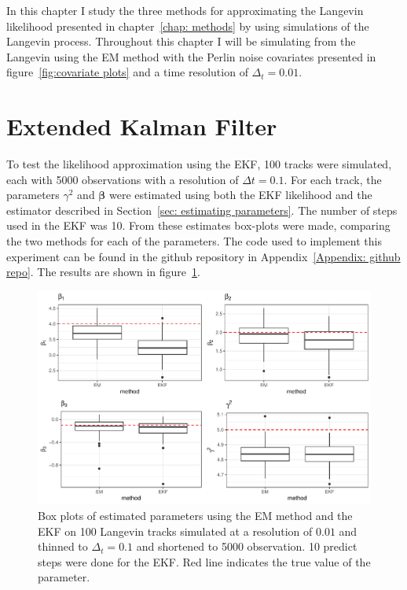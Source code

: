


In this chapter I study the three methods for approximating the Langevin likelihood presented in chapter~\ref{chap: methods} by using simulations of the Langevin process. Throughout this chapter I will be simulating from the Langevin using the EM method with the Perlin noise covariates presented in figure~\ref{fig:covariate plots} and a time resolution of $\Delta_t =0.01$.




\section{Extended Kalman Filter}
\label{sec: EKF test}
To test the likelihood approximation using the EKF, 100 tracks were simulated, each with 5000 observations with a resolution of $\Delta t = 0.1$. For each track, the parameters $\gamma^2$ and $\bm \beta$ were estimated using both the EKF likelihood and the estimator described in Section~\ref{sec: estimating parameters}. The number of steps used in the EKF was 10. From these estimates box-plots were made, comparing the two methods for each of the parameters. The code used to implement this experiment can be found in the github repository in Appendix~\ref{Appendix: github repo}. The results are shown in figure~\ref{fig:EKF_thin_boxplot}.

 

\begin{figure}[H]
    \centering
    \includegraphics[width=\linewidth]{Images/Results/EM EKF plot.pdf}
    \caption[EM and EKF estimates]{Box plots of estimated parameters using the EM method and the EKF on 100 Langevin tracks simulated at a resolution of $0.01$ and thinned to $\Delta_t=0.1$ and shortened to 5000 observation. 10 predict steps were done for the EKF. Red line indicates the true value of the parameter.}
    \label{fig:EKF_thin_boxplot}
\end{figure}

